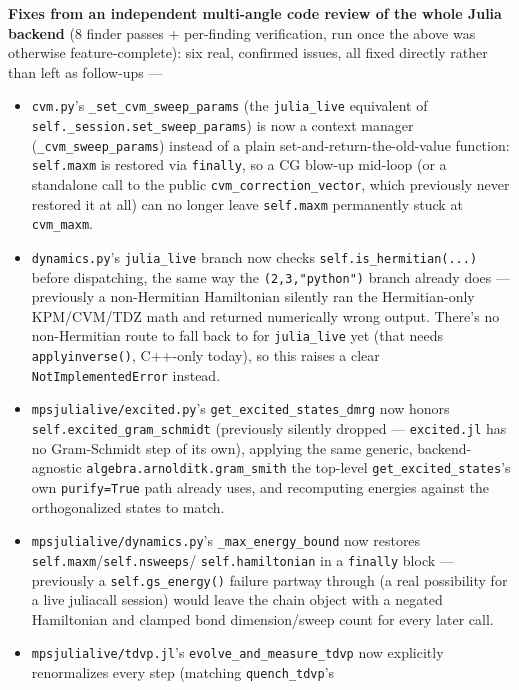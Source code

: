 \documentclass[11pt]{article}
\begin{document}
\textbf{Fixes from an independent multi-angle code review of the whole
Julia backend} (8 finder passes + per-finding verification, run once the
above was otherwise feature-complete): six real, confirmed issues, all
fixed directly rather than left as follow-ups ---

\begin{itemize}
\item \texttt{cvm.py}'s \texttt{\_set\_cvm\_sweep\_params} (the
  \texttt{julia\_live} equivalent of
  \texttt{self.\_session.set\_sweep\_params}) is now a context manager
  (\texttt{\_cvm\_sweep\_params}) instead of a plain
  set-and-return-the-old-value function: \texttt{self.maxm} is restored
  via \texttt{finally}, so a CG blow-up mid-loop (or a standalone call to
  the public \texttt{cvm\_correction\_vector}, which previously never
  restored it at all) can no longer leave \texttt{self.maxm} permanently
  stuck at \texttt{cvm\_maxm}.
\item \texttt{dynamics.py}'s \texttt{julia\_live} branch now checks
  \texttt{self.is\_hermitian(...)} before dispatching, the same way the
  \texttt{(2,3,"python")} branch already does --- previously a
  non-Hermitian Hamiltonian silently ran the Hermitian-only KPM/CVM/TDZ
  math and returned numerically wrong output. There's no non-Hermitian
  route to fall back to for \texttt{julia\_live} yet (that needs
  \texttt{applyinverse()}, C++-only today), so this raises a clear
  \texttt{NotImplementedError} instead.
\item \texttt{mpsjulialive/excited.py}'s \texttt{get\_excited\_states\_dmrg}
  now honors \texttt{self.excited\_gram\_schmidt} (previously silently
  dropped --- \texttt{excited.jl} has no Gram-Schmidt step of its own),
  applying the same generic, backend-agnostic
  \texttt{algebra.arnolditk.gram\_smith} the top-level
  \texttt{get\_excited\_states}'s own \texttt{purify=True} path already
  uses, and recomputing energies against the orthogonalized states to
  match.
\item \texttt{mpsjulialive/dynamics.py}'s \texttt{\_max\_energy\_bound}
  now restores \texttt{self.maxm}/\texttt{self.nsweeps}/
  \texttt{self.hamiltonian} in a \texttt{finally} block --- previously a
  \texttt{self.gs\_energy()} failure partway through (a real possibility
  for a live juliacall session) would leave the chain object with a
  negated Hamiltonian and clamped bond dimension/sweep count for every
  later call.
\item \texttt{mpsjulialive/tdvp.jl}'s \texttt{evolve\_and\_measure\_tdvp}
  now explicitly renormalizes every step (matching \texttt{quench\_tdvp}'s

\end{itemize}
\end{document}
